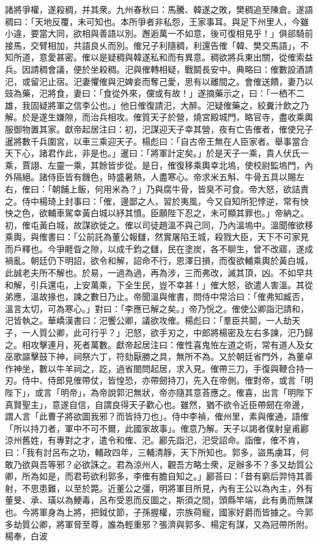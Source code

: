\begin{pinyinscope}
諸將爭權，遂殺稠，并其衆。九州春秋曰：馬騰、韓遂之敗，樊稠追至陳倉。遂語稠曰：「天地反覆，未可知也。本所爭者非私怨，王家事耳。與足下州里人，今雖小違，要當大同，欲相與善語以別。邂逅萬一不如意，後可復相見乎！」俱郤騎前接馬，交臂相加，共語良乆而別。傕兄子利隨稠，利還告傕「韓、樊交馬語」，不知所道，意愛甚密。傕以是疑稠與韓遂私和而有異意。稠欲將兵東出關，從傕索益兵。因請稠會議，便於坐殺稠。汜與傕轉相疑，戰鬬長安中。典略曰：傕數設酒請汜，或留汜止宿。汜妻懼傕與汜婢妾而奪己愛，思有以離間之。會傕送饋，妻乃以豉為藥，汜將食，妻曰：「食從外來，儻或有故！」遂摘藥示之，曰：「一栖不二雄，我固疑將軍之信李公也。」他日傕復請汜，大醉。汜疑傕藥之，絞糞汁飲之乃解。於是遂生嫌隙，而治兵相攻。傕質天子於營，燒宮殿城門，略官寺，盡收乘輿服御物置其家。獻帝起居注曰：初，汜謀迎天子幸其營，夜有亡告傕者，傕使兄子暹將數千兵圍宮，以車三乘迎天子。楊彪曰：「自古帝王無在人臣家者。舉事當合天下心，諸君作此，非是也。」暹曰：「將軍計定矣。」於是天子一乘，貴人伏氏一乘，賈詡、左靈一乘，其餘皆步從。是日，傕復移乘輿幸北塢，使校尉監塢門，內外隔絕。諸侍臣皆有饑色，時盛暑熱，人盡寒心。帝求米五斛、牛骨五具以賜左右，傕曰：「朝餔上飯，何用米為？」乃與腐牛骨，皆臭不可食。帝大怒，欲詰責之。侍中楊琦上封事曰：「傕，邊鄙之人，習於夷風，今又自知所犯悖逆，常有怏怏之色，欲輔車駕幸黃白城以紓其憤。臣願陛下忍之，未可顯其罪也。」帝納之。初，傕屯黃白城，故謀欲徙之。傕以司徒趙溫不與己同，乃內溫塢中。溫聞傕欲移乘輿，與傕書曰：「公前託為董公報讎，然實屠陷王城，殺戮大臣，天下不可家見而戶釋也。今爭睚眥之隙，以成千鈞之讎，民在塗炭，各不聊生，曾不改寤，遂成禍亂。朝廷仍下明詔，欲令和解，詔命不行，恩澤日損，而復欲輔乘輿於黃白城，此誠老夫所不解也。於易，一過為過，再為涉，三而弗改，滅其頂，凶。不如早共和解，引兵還屯，上安萬乘，下全生民，豈不幸甚！」傕大怒，欲遣人害溫。其從弟應，溫故掾也，諫之數日乃止。帝聞溫與傕書，問侍中常洽曰：「傕弗知臧否，溫言太切，可為寒心。」對曰：「李應已解之矣。」帝乃恱之。傕使公卿詣汜請和，汜皆執之。華嶠漢書曰：汜饗公卿，議欲攻傕。楊彪曰：「羣臣共鬬，一人劫天子，一人質公卿，此可行乎？」汜怒，欲手刃之，中郎將楊密及左右多諫，汜乃歸之。相攻擊連月，死者萬數。獻帝起居注曰：傕性喜鬼恠左道之術，常有道人及女巫歌謳擊鼓下神，祠祭六丁，符劾厭勝之具，無所不為。又於朝廷省門外，為董卓作神坐，數以牛羊祠之，訖，過省閤問起居，求入見。傕帶三刀，手復與鞭合持一刃。侍中、侍郎見傕帶仗，皆惶恐，亦帶劒持刀，先入在帝側。傕對帝，或言「明陛下」，或言「明帝」，為帝說郭汜無狀，帝亦隨其意荅應之。傕喜，出言「明陛下真賢聖主」，意遂自信，自謂良得天子歡心也。雖然，猶不欲令近臣帶劒在帝邊，謂人言「此曹子將欲圖我邪？而皆持刀也」。侍中李禎，傕州里，素與傕通，語傕「所以持刀者，軍中不可不爾，此國家故事」。傕意乃解。天子以謁者僕射皇甫酈涼州舊姓，有專對之才，遣令和傕、汜。酈先詣汜，汜受詔命。詣傕，傕不肯，曰：「我有討呂布之功，輔政四年，三輔清靜，天下所知也。郭多，盜馬虜耳，何敢乃欲與吾等邪？必欲誅之。君為涼州人，觀吾方略士衆，足辦多不？多又劫質公卿，所為如是，而君苟欲利郭多，李傕有膽自知之。」酈荅曰：「昔有窮后羿恃其善射，不思患難，以至於斃。近董公之彊，明將軍目所見，內有王公以為內主，外有董旻、承、璜以為鯁毒，呂布受恩而反圖之，斯須之間，頭縣竿端，此有勇而無謀也。今將軍身為上將，把鉞仗節，子孫握權，宗族荷寵，國家好爵而皆據之。今郭多劫質公卿，將軍脅至尊，誰為輕重邪？張濟與郭多、楊定有謀，又為冠帶所附。楊奉，白波
\end{pinyinscope}
